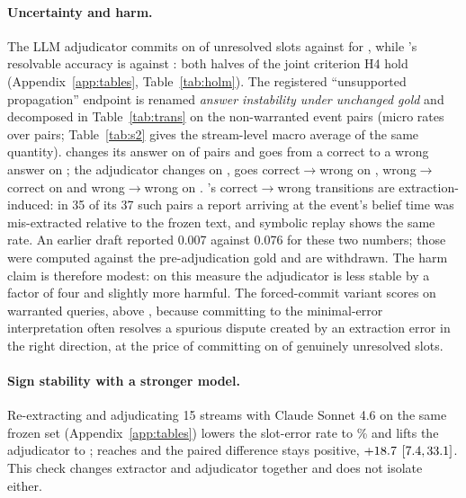 \paragraph{Uncertainty and harm.} The LLM adjudicator commits on \sTwoLogCommit{} of unresolved slots against \sTwoPalCommit{} for \pal, while \pal's resolvable accuracy is \sTwoPalRes{} against \sTwoLogRes: both halves of the joint criterion H4 hold (Appendix~\ref{app:tables}, Table~\ref{tab:holm}). The registered ``unsupported propagation'' endpoint is renamed \emph{answer instability under unchanged gold} and decomposed in Table~\ref{tab:trans} on the \trN{} non-warranted event pairs (micro rates over pairs; Table~\ref{tab:s2} gives the stream-level macro average of the same quantity). \pal{} changes its answer on \trPalInst{} of pairs and goes from a correct to a wrong answer on \trPalCW; the adjudicator changes on \trLogInst, goes correct$\to$wrong on \trLogCW, wrong$\to$correct on \trLogWC{} and wrong$\to$wrong on \trLogWW. \pal's correct$\to$wrong transitions are extraction-induced: in 35 of its 37 such pairs a report arriving at the event's belief time was mis-extracted relative to the frozen text, and symbolic replay shows the same rate. An earlier draft reported 0.007 against 0.076 for these two numbers; those were computed against the pre-adjudication gold and are withdrawn. The harm claim is therefore modest: on this measure the adjudicator is less stable by a factor of four and slightly more harmful. The forced-commit variant scores \sTwoCommitWarr{} on warranted queries, above \pal, because committing to the minimal-error interpretation often resolves a spurious dispute created by an extraction error in the right direction, at the price of committing on \sTwoCommitCommit{} of genuinely unresolved slots.


\paragraph{Sign stability with a stronger model.} Re-extracting and adjudicating 15 streams with Claude Sonnet 4.6 on the same frozen set (Appendix~\ref{app:tables}) lowers the slot-error rate to \sStrongExtSlot\% and lifts the adjudicator to \sStrongLogWarr{}; \pal{} reaches \sStrongPalWarr{} and the paired difference stays positive, $+18.7$ $[7.4, 33.1]$. This check changes extractor and adjudicator together and does not isolate either.

